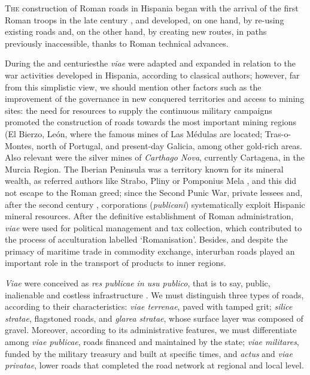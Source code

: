 
	
	\lettrine[nindent=0em,lines=3]{T}{he} construction of Roman roads in Hispania began with the arrival of the first Roman troops in the late  century \BC, and developed, on one hand, by re-using existing roads \parencite[26]{Sillières_2003} and, on the other hand, by creating new routes, in paths previously inaccessible, thanks to Roman technical advances.
	
	During the  and  centuries\BC the \textit{viae} were adapted and expanded in relation to the war activities developed in Hispania, according to classical authors; however, far from this simplistic view, we should mention other factors such as the improvement of the governance in new conquered territories and access to mining sites: the need for resources to supply the continuous military campaigns promoted the construction of roads towards the most important mining regions (El Bierzo, León, where the famous mines of Las Médulas are located; Tras-o-Montes, north of Portugal, and present-day Galicia, among other gold-rich areas. Also relevant were the silver mines of \textit{Carthago Nova}, currently Cartagena, in the Murcia Region. The Iberian Peninsula was a territory known for its mineral wealth, as referred authors like Strabo, Pliny or Pomponius Mela \parencite[40--49]{Blázquez_1968}, and this did not escape to the Roman greed; since the Second Punic War, private lessees and, after the second century \BC, corporations (\textit{publicani}) systematically exploit Hispanic mineral resources. After the definitive establishment of Roman administration, \textit{viae} were used for political management and tax collection, which contributed to the process of acculturation labelled ‘Romanisation’. Besides, and despite the primacy of maritime trade in commodity exchange, interurban roads played an important role in the transport of products to inner regions.
	
	\textit{Viae} were conceived as \textit{res publicae in usu publico}, that is to say, public, inalienable and costless infrastructure \parencite[63]{Ponte_2007}. We must distinguish three types of roads, according to their characteristics: \textit{viae terrenae}, paved with tamped grit; \textit{silice stratae}, flagstoned roads, and \textit{glarea stratae}, whose surface layer was composed of gravel. Moreover, according to its administrative features, we must differentiate among \textit{viae publicae}, roads financed and maintained by the state; \textit{viae militares}, funded by the military treasury and built at specific times, and \textit{actus} and \textit{viae privatae}, lower roads that completed the road network at regional and local level.
	
